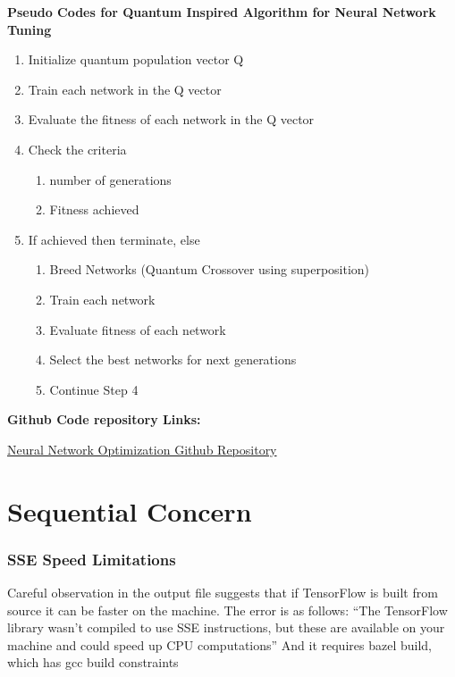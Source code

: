 \textbf{Pseudo Codes for Quantum Inspired Algorithm for Neural Network Tuning}

\begin{enumerate}
	\item Initialize quantum population vector Q
	\item Train each network in the Q vector
	\item Evaluate the fitness of each network in the Q vector
	\item Check the criteria
	\begin{enumerate}
		\item number of generations
		\item Fitness achieved
	\end{enumerate}
	\item If achieved then terminate, else
	\begin{enumerate}
		\item Breed Networks (Quantum Crossover using superposition)
		\item Train each network
		\item Evaluate fitness of each network
		\item Select the best networks for next generations
		\item Continue Step 4
	\end{enumerate}
\end{enumerate}


\textbf{Github Code repository Links:}

\href{https://github.com/bhatnags/NeuralNetworkOptimization_EETO}{Neural Network Optimization Github Repository}




\section{Sequential Concern}

\subsubsection{SSE Speed Limitations}
Careful observation in the output file suggests that if TensorFlow is built from source it can be faster on the machine. The error is as follows:
“The TensorFlow library wasn't compiled to use SSE instructions, but these are available on your machine and could speed up CPU computations”
And it requires bazel build, which has gcc build constraints 


